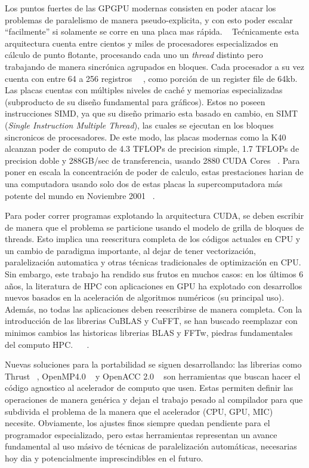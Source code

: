 Los puntos fuertes de las GPGPU modernas consisten en poder atacar los problemas de paralelismo
de manera pseudo-explicita, y con esto poder escalar ``facilmente'' si solamente se corre en una
placa mas r\'apida. ~\cite{} Te\'cnicamente esta arquitectura cuenta entre cientos y miles de procesadores
especializados en c\'alculo de punto flotante, procesando cada uno un \textit{thread} distinto pero
trabajando de manera sincr\'onica agrupados en bloques. Cada procesador a su vez cuenta con entre
64 a 256 registros ~\cite{NvidiaFermi}~\cite{NvidiaKepler}, como porci\'on de un register file de 64kb.
Las placas cuentas con m\'ultiples niveles de cach\'e y memorias especializadas (subproducto de
su dise\~no fundamental para gr\'aficos). Estos no poseen instrucciones SIMD, ya que su dise\~no primario
esta basado en cambio, en SIMT (\textit{Single Instruction Multiple Thread}), las cuales se ejecutan en los
bloques sincronicos de procesadores. De este modo, las placas modernas como la K40 alcanzan
poder de computo de 4.3 TFLOPs de precision simple, 1.7 TFLOPs de precision doble y 288GB/sec de
transferencia, usando 2880 CUDA Cores ~\cite{NvidiaKeplerDatasheet}. Para poner en escala la concentraci\'on
de poder de calculo, estas prestaciones harian de una computadora usando solo dos de estas placas
la supercomputadora m\'as potente del mundo en Noviembre 2001 ~\cite{Top500November2001}.

Para poder correr programas explotando la arquitectura CUDA, se deben escribir de manera que
el problema se particione usando el modelo de grilla de bloques de threads. Esto implica una
reescritura completa de los c\'odigos actuales en CPU y un cambio de paradigma importante, al
dejar de tener vectorizaci\'on, paralelizaci\'on automatica y otras t\'ecnicas tradicionales
de optimizaci\'on en CPU. Sin embargo, este trabajo ha rendido sus frutos en muchos casos:
en los \'ultimos 6 a\~nos, la literatura de HPC con aplicaciones en GPU ha explotado con
desarrollos nuevos basados en la aceleraci\'on de algoritmos num\'ericos (su principal uso).
Adem\'as, no todas las aplicaciones deben reescribirse de manera completa. Con la introducci\'on
de las librerias CuBLAS y CuFFT, se han buscado reemplazar con minimos cambios las historicas
librerias BLAS y FFTw, piedras fundamentales del computo HPC. ~\cite{cublas} ~\cite{cufft}.

Nuevas soluciones para la portabilidad se siguen desarrollando: las librerias como Thrust ~\cite{thrust},
OpenMP4.0 ~\cite{OpenMPspec} y OpenACC 2.0 ~\cite{OpenACCSpec} son herramientas que buscan hacer el
c\'odigo agnostico al acelerador de computo que usen. Estas permiten definir las operaciones de
manera gen\'erica y dejan el trabajo pesado al compilador para que subdivida el problema de la manera
que el acelerador (CPU, GPU, MIC) necesite. Obviamente, los ajustes finos siempre quedan pendiente para
el programador especializado, pero estas herramientas representan un avance fundamental al uso
m\'asivo de t\'ecnicas de paralelizaci\'on autom\'aticas, necesarias hoy dia y potencialmente
imprescindibles en el futuro.

